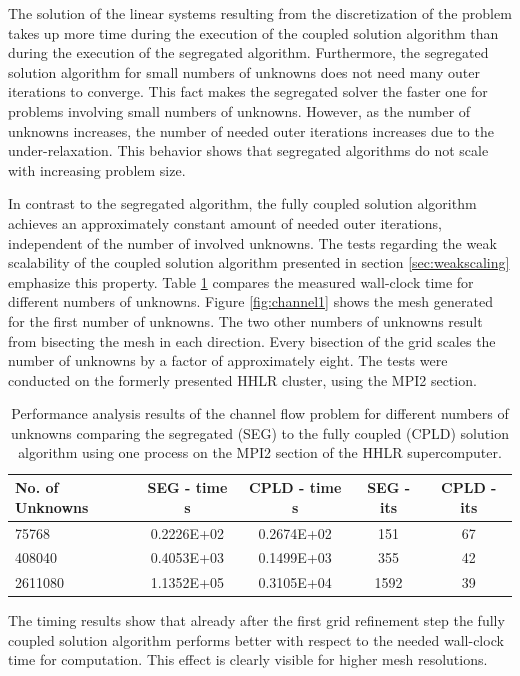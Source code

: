 The solution of the linear systems resulting from the discretization of the problem takes up more time during the execution of the coupled solution algorithm than during the execution of the segregated algorithm. Furthermore, the segregated solution algorithm for small numbers of unknowns does not need many outer iterations to converge. This fact makes the segregated solver the faster one for problems involving small numbers of unknowns. However, as the number of unknowns increases, the number of needed outer iterations increases due to the under-relaxation. This behavior shows that segregated algorithms do not scale with increasing problem size.

In contrast to the segregated algorithm, the fully coupled solution algorithm achieves an approximately constant amount of needed outer iterations, independent of the number of involved unknowns. The tests regarding the weak scalability of the coupled solution algorithm presented in section \ref{sec:weakscaling} emphasize this property. Table \ref{tab:channelcompare} compares the measured wall-clock time for different numbers of unknowns. Figure \ref{fig:channel1} shows the mesh generated for the first number of unknowns. The two other numbers of unknowns result from bisecting the mesh in each direction. Every bisection of the grid scales the number of unknowns by a factor of approximately eight. The tests were conducted on the formerly presented HHLR cluster, using the MPI2 section. 

\begin{table}[h!]\centering
  \caption{Performance analysis results of the channel flow problem for different numbers of unknowns comparing the segregated (SEG) to the fully coupled (CPLD) solution algorithm using one process on the MPI2 section of the HHLR supercomputer. }
  \begin{tabular}{lcccc}\toprule
    No. of Unknowns & SEG - time s & CPLD - time s & SEG - its & CPLD - its \\
    \midrule
    \rowcolor{tud0a} 75768    & 0.2226E+02 & 0.2674E+02 & 151  & 67 \\
    \rowcolor{black!00} 408040   & 0.4053E+03 & 0.1499E+03 & 355  & 42 \\
    \rowcolor{tud0a} 2611080  & 1.1352E+05 & 0.3105E+04 & 1592 & 39 \\
  \end{tabular}
  \label{tab:channelcompare}
\end{table}

The timing results show that already after the first grid refinement step the fully coupled solution algorithm performs better with respect to the needed wall-clock time for computation. This effect is clearly visible for higher mesh resolutions.

